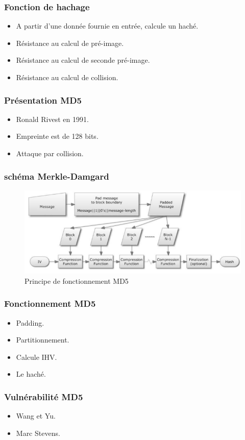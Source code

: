 \begin{frame}
\frametitle{Fonction de hachage}


\begin{itemize}
\item A partir d'une donnée fournie en entrée, calcule un haché.\\
\item Résistance au calcul de pré-image.
\item Résistance au calcul de seconde pré-image.
\item Résistance au calcul de collision.\\
\end{itemize}
\end{frame}

\begin{frame}
\frametitle{Présentation MD5}

\begin{itemize}
\item Ronald Rivest en 1991.\\
\item Empreinte est de 128 bits.\\
\item Attaque par collision.
\end{itemize}
\end{frame}

\begin{frame}
\frametitle{schéma Merkle-Damgard}
\begin{figure}[h!]
\center
 \includegraphics[width=11.5cm]{images/md.png}
 
  \caption{Principe de fonctionnement MD5}
\end{figure}
\end{frame}

\begin{frame}
\frametitle{Fonctionnement MD5}


\begin{itemize}
\item Padding.\\
\item Partitionnement.\\
\item Calcule IHV.\\
\item Le haché.\\

\end{itemize}
\end{frame}


\begin{frame}
\frametitle{Vulnérabilité MD5}

\begin{itemize}
\item Wang et Yu.\\
\item Marc Stevens.\\
\end{itemize}
\end{frame}